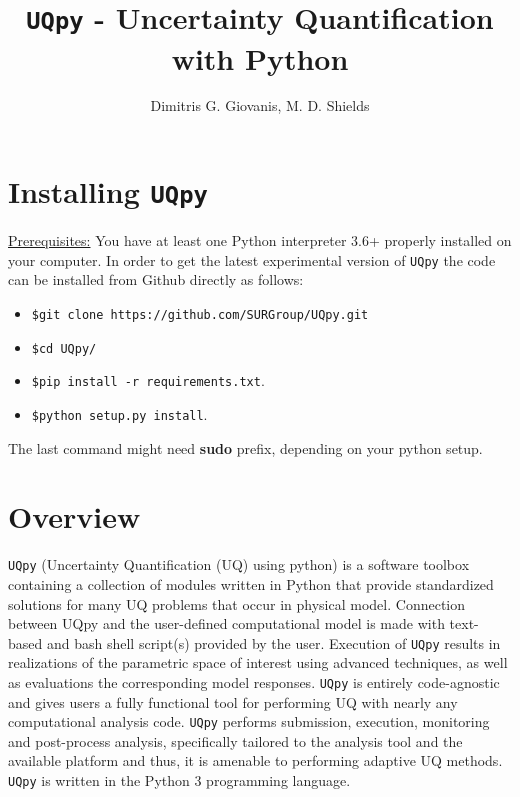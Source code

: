 \documentclass[preprint,12pt]{elsarticle}
\begin{document}
\begin{frontmatter}


\title{\texttt{UQpy} - Uncertainty Quantification with Python}
\author{Dimitris G. Giovanis, M. D. Shields}

\address{Johns Hopkins University, USA}

\end{frontmatter}

\linenumbers
\section{Installing \texttt{UQpy}}

\underline{Prerequisites:}
You have at least one Python interpreter 3.6+ properly installed on your computer. In order to get the latest experimental version of  \texttt{UQpy} the code can be installed from Github directly as follows:

\begin{itemize}
\item[ ]  \texttt{\$git clone https://github.com/SURGroup/UQpy.git}
\item[ ] \texttt{\$cd UQpy/}
\item[ ] \texttt{\$pip install -r  requirements.txt}.
\item[ ]  \texttt{\$python setup.py install}.
\end{itemize}

\noindent
The last command might need \textbf{sudo} prefix, depending on your python setup. 

\section{Overview}
\label{S:overview}
\noindent
\texttt{UQpy} (Uncertainty Quantification (UQ) using python) is a software toolbox containing a collection of modules  written in Python that provide standardized solutions for many UQ problems that occur in physical model. Connection between UQpy and the user-defined computational model is made with text-based and bash shell script(s) provided by the user. Execution of \texttt{UQpy} results in realizations of the parametric space of interest using advanced techniques, as well as evaluations the corresponding model responses. \texttt{UQpy} is entirely code-agnostic and gives users a fully functional tool for performing UQ with nearly any computational analysis code. \texttt{UQpy} performs submission, execution, monitoring and post-process analysis, specifically tailored to  the analysis tool and the available platform and thus, it is amenable to performing adaptive UQ methods. \texttt{UQpy} is written in the Python 3 programming language.
\end{document}
